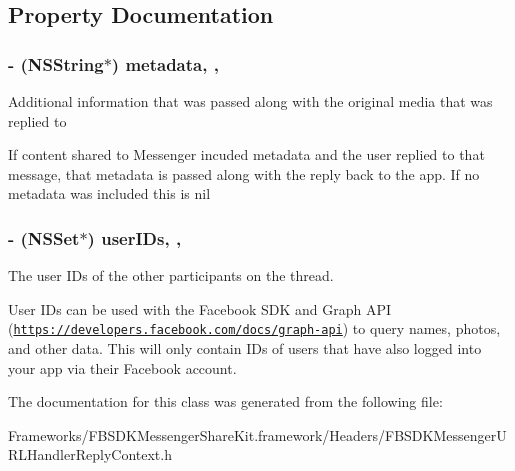 \subsection{Property Documentation}
\hypertarget{interface_f_b_s_d_k_messenger_u_r_l_handler_reply_context_a6c5f74a436e2dbf6443853c9a64b725f}{}
\subsubsection[{metadata}]{\setlength{\rightskip}{0pt plus 5cm}-\/ (N\+S\+String$\ast$) metadata\hspace{0.3cm}{\ttfamily [read]}, {\ttfamily [nonatomic]}, {\ttfamily [copy]}}\label{interface_f_b_s_d_k_messenger_u_r_l_handler_reply_context_a6c5f74a436e2dbf6443853c9a64b725f}
Additional information that was passed along with the original media that was replied to

If content shared to Messenger incuded metadata and the user replied to that message, that metadata is passed along with the reply back to the app. If no metadata was included this is nil \hypertarget{interface_f_b_s_d_k_messenger_u_r_l_handler_reply_context_ad90f842303b7d910f85ab8996294c011}{}
\subsubsection[{user\+I\+Ds}]{\setlength{\rightskip}{0pt plus 5cm}-\/ (N\+S\+Set$\ast$) user\+I\+Ds\hspace{0.3cm}{\ttfamily [read]}, {\ttfamily [nonatomic]}, {\ttfamily [copy]}}\label{interface_f_b_s_d_k_messenger_u_r_l_handler_reply_context_ad90f842303b7d910f85ab8996294c011}
The user I\+Ds of the other participants on the thread.

User I\+Ds can be used with the Facebook S\+D\+K and Graph A\+P\+I (\href{https://developers.facebook.com/docs/graph-api}{\tt https\+://developers.\+facebook.\+com/docs/graph-\/api}) to query names, photos, and other data. This will only contain I\+Ds of users that have also logged into your app via their Facebook account. 

The documentation for this class was generated from the following file\+:\begin{DoxyCompactItemize}
\item 
Frameworks/\+F\+B\+S\+D\+K\+Messenger\+Share\+Kit.\+framework/\+Headers/F\+B\+S\+D\+K\+Messenger\+U\+R\+L\+Handler\+Reply\+Context.\+h\end{DoxyCompactItemize}

